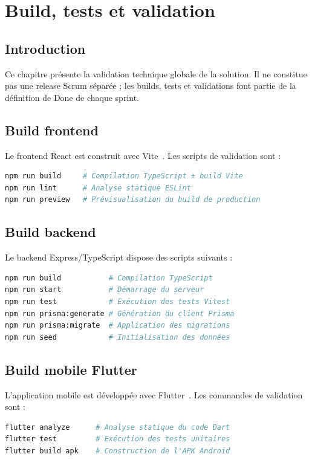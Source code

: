 \chapter{Build, tests et validation}
\label{chap:build_tests}

\section*{Introduction}
Ce chapitre présente la validation technique globale de la solution. Il ne constitue pas une release Scrum séparée ; les builds, tests et validations font partie de la définition de Done de chaque sprint.

\section{Build frontend}
Le frontend React est construit avec Vite~\cite{vite}. Les scripts de validation sont :
\begin{lstlisting}[language=bash,caption={Scripts de build frontend}]
npm run build     # Compilation TypeScript + build Vite
npm run lint      # Analyse statique ESLint
npm run preview   # Prévisualisation du build de production
\end{lstlisting}

\section{Build backend}
Le backend Express/TypeScript dispose des scripts suivants :
\begin{lstlisting}[language=bash,caption={Scripts de build backend}]
npm run build           # Compilation TypeScript
npm run start           # Démarrage du serveur
npm run test            # Exécution des tests Vitest
npm run prisma:generate # Génération du client Prisma
npm run prisma:migrate  # Application des migrations
npm run seed            # Initialisation des données
\end{lstlisting}

\section{Build mobile Flutter}
L'application mobile est développée avec Flutter~\cite{flutter}. Les commandes de validation sont :
\begin{lstlisting}[language=bash,caption={Scripts de build Flutter}]
flutter analyze      # Analyse statique du code Dart
flutter test         # Exécution des tests unitaires
flutter build apk    # Construction de l'APK Android
\end{lstlisting}

